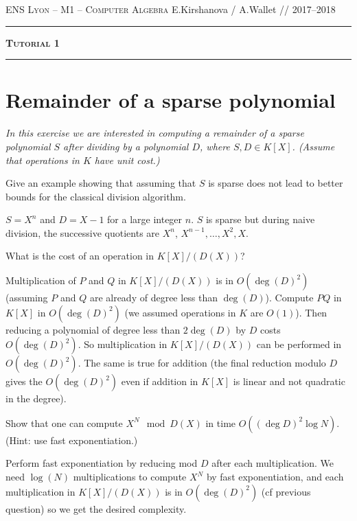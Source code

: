 \documentclass[11pt]{exam}
\theoremstyle{definition}
\begin{document}
{\noindent
   \textsc{ENS Lyon --  M1 -- Computer Algebra}
   \hfill { E.Kirshanova / A.Wallet // 2017--2018\\
  }
  \hrule
  \begin{center}
    {\Large\textbf{
   \textsc{Tutorial 1}
    } } 
  \end{center}
  \hrule \vspace{5mm}

\thispagestyle{empty}

\vspace{0.2cm}


\section{Remainder of a sparse polynomial}
{\sl In this exercise we are interested in computing a remainder of a sparse polynomial $S$ after dividing by a polynomial $D$, where $S,D\in K[X]$. (Assume that operations in $K$ have unit cost.)}


\begin{questions}

\question Give an example showing that assuming that $S$ is sparse does not lead to better bounds for the classical division algorithm. 
\begin{solution}$S = X^n$ and $D = X-1$ for a large integer $n$. $S$ is sparse but during naive division, the successive quotients are $X^n$, $X^{n-1}, \dots, X^2, X$.
\end{solution}

\question What is the cost of an operation in $ K[X]/(D(X))$?
\begin{solution}
Multiplication of $P$ and $Q$ in $ K[X]/(D(X))$ is in $O(\deg(D)^2)$ (assuming $P$ and $Q$ are already of degree less than $\deg(D)$). Compute $PQ$ in $K[X]$ in $O(\deg(D)^2)$ (we assumed operations in $K$ are $O(1)$). Then reducing a polynomial of degree less than $2 \deg(D)$ by $D$ costs $O(\deg(D)^2)$. So multiplication in $ K[X]/(D(X))$ can be performed in $O(\deg(D)^2)$. The same is true for addition (the final reduction modulo $D$ gives the $O(\deg(D)^2)$ even if addition in $K[X]$ is linear and not quadratic in the degree).
\end{solution}

\question Show that one can compute $X^N \mod D(X)$ in time $O ((\deg D)^2 \log N)$. (Hint: use fast exponentiation.)
\begin{solution}
Perform fast exponentiation by reducing mod $D$ after each multiplication. We need $\log(N)$ multiplications to compute $X^N$ by fast exponentiation, and each multiplication in $ K[X]/(D(X))$ is in $O(\deg(D)^2)$ (cf previous question) so we get the desired complexity.
\end{solution}


\end{questions}}
\end{document}
